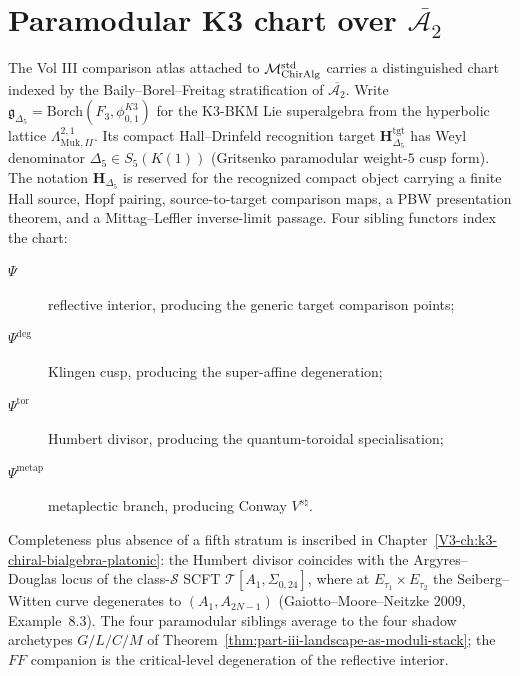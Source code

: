 \section{Paramodular K3 chart over $\overline{\mathcal A_2}$}
\label{sec:part-iii-paramodular-chart}

The Vol III comparison atlas attached to
$\mathcal{M}_{\mathrm{ChirAlg}}^{\mathrm{std}}$ carries a distinguished chart
indexed by the Baily--Borel--Freitag stratification of
$\overline{\mathcal A_2}$. Write
$\mathfrak g_{\Delta_5} = \mathrm{Borch}(F_3,\phi^{K3}_{0,1})$ for
the K3-BKM Lie superalgebra from the hyperbolic lattice
$\Lambda_{\mathrm{Muk},II}^{2,1}$.  Its compact Hall--Drinfeld
recognition target \(\mathbf H_{\Delta_5}^{\mathrm{tgt}}\) has Weyl
denominator \(\Delta_5 \in S_5(K(1))\) (Gritsenko paramodular
weight-$5$ cusp form).  The notation
\(\mathbf H_{\Delta_5}\) is reserved for the recognized compact object
carrying a finite Hall source, Hopf pairing, source-to-target comparison
maps, a PBW presentation theorem, and a Mittag--Leffler inverse-limit
passage.
Four sibling functors index the chart:
\begin{description}
 \item[$\Psi$] reflective interior, producing the generic target
 comparison points;
 \item[$\Psi^{\deg}$] Klingen cusp, producing the super-affine
 degeneration;
 \item[$\Psi^{\mathrm{tor}}$] Humbert divisor, producing the
 quantum-toroidal specialisation;
 \item[$\Psi^{\mathrm{metap}}$] metaplectic branch, producing
 Conway $V^{s\natural}$.
\end{description}
Completeness plus absence of a fifth stratum is inscribed in
Chapter~\ref{V3-ch:k3-chiral-bialgebra-platonic}: the Humbert
divisor coincides with the Argyres--Douglas locus of the
class-$\mathcal S$ SCFT $\mathcal T[A_1,\Sigma_{0,24}]$, where at
$E_{\tau_1}\times E_{\tau_2}$ the Seiberg--Witten curve degenerates
to $(A_1,A_{2N-1})$ (Gaiotto--Moore--Neitzke $2009$, Example~$8.3$).
The four paramodular siblings average to the four shadow archetypes
$G/L/C/M$ of Theorem~\ref{thm:part-iii-landscape-as-moduli-stack};
the $FF$ companion is the critical-level degeneration of the
reflective interior.

